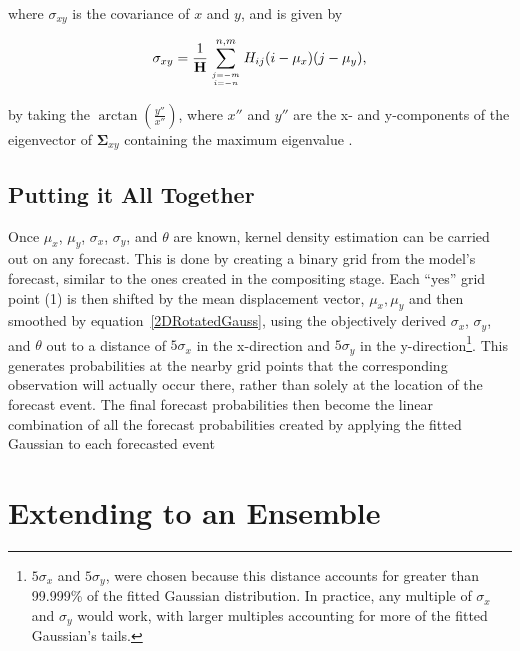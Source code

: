 \noindent where $\sigma_{xy}$ is the covariance of $x$ and $y$, and is given by

    \begin{equation}
        \label{sigmaxy}
        \sigma_{xy} = \frac{1}{\mathbf{H}} \sum\limits_{j=-m \atop i=-n}^{n,m}H_{ij}(i - \mu_x)(j - \mu_y),
    \end{equation}

\noindent by taking the $\arctan{\left(\frac{y''}{x''}\right)}$, where $x''$ and $y''$ are the x- and y-components of the eigenvector of $\boldsymbol{\Sigma}_{xy}$ containing the maximum eigenvalue \citep{Lak2010}.




\subsection{Putting it All Together}
\label{kde}

Once $\mu_x$, $\mu_y$, $\sigma_x$, $\sigma_y$, and $\theta$ are known, kernel density estimation can be carried out on any forecast. This is done by creating a binary grid from the model's forecast, similar to the ones created in the compositing stage.  Each ``yes'' grid point (1) is then shifted by the mean displacement vector, ${\mu_x, \mu_y}$ and then smoothed by \mbox{equation \ref{2DRotatedGauss}}, using the objectively derived $\sigma_x$, $\sigma_y$, and $\theta$ out to a distance of $5\sigma_x$ in the x-direction and $5\sigma_y$ in the y-direction\footnote{$5\sigma_x$ and $5\sigma_y$, were chosen because this distance accounts for greater than 99.999\% of the fitted Gaussian distribution. In practice, any multiple of $\sigma_x$ and $\sigma_y$ would work, with larger multiples accounting for more of the fitted Gaussian's tails.}. This generates probabilities at the nearby grid points that the corresponding observation will actually occur there, rather than solely at the location of the forecast event. The final forecast probabilities then become the linear combination of all the forecast probabilities created by applying the fitted Gaussian to each forecasted event




\section{Extending to an Ensemble}
\label{emethod}
